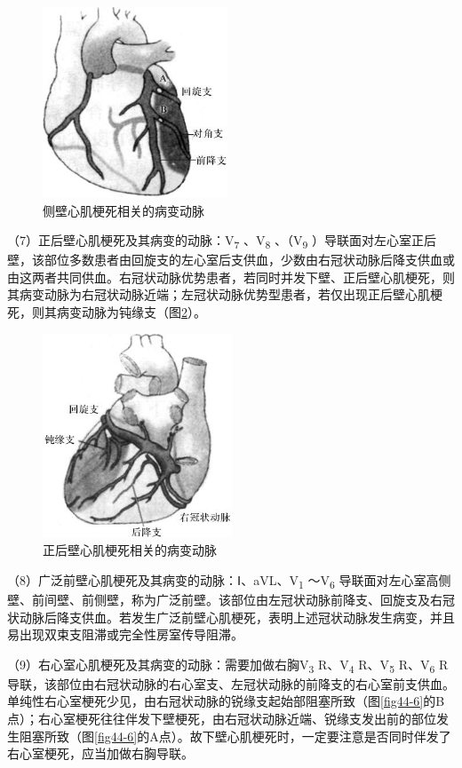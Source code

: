 \begin{figure}[!htbp]
 \centering
 \includegraphics[width=2.16667in,height=2.23958in]{./images/Image00712.jpg}
 \captionsetup{justification=centering}
 \caption{侧壁心肌梗死相关的病变动脉}
 \label{fig44-4}
  \end{figure} 

（7）正后壁心肌梗死及其病变的动脉：V\textsubscript{7}
、V\textsubscript{8} 、（V\textsubscript{9}
）导联面对左心室正后壁，该部位多数患者由回旋支的左心室后支供血，少数由右冠状动脉后降支供血或由这两者共同供血。右冠状动脉优势患者，若同时并发下壁、正后壁心肌梗死，则其病变动脉为右冠状动脉近端；左冠状动脉优势型患者，若仅出现正后壁心肌梗死，则其病变动脉为钝缘支（图\ref{fig44-5}）。

\begin{figure}[!htbp]
 \centering
 \includegraphics[width=2.21875in,height=2.39583in]{./images/Image00713.jpg}
 \captionsetup{justification=centering}
 \caption{正后壁心肌梗死相关的病变动脉}
 \label{fig44-5}
  \end{figure} 

（8）广泛前壁心肌梗死及其病变的动脉：Ⅰ、aVL、V\textsubscript{1}
～V\textsubscript{6}
导联面对左心室高侧壁、前间壁、前侧壁，称为广泛前壁。该部位由左冠状动脉前降支、回旋支及右冠状动脉后降支供血。若发生广泛前壁心肌梗死，表明上述冠状动脉发生病变，并且易出现双束支阻滞或完全性房室传导阻滞。

（9）右心室心肌梗死及其病变的动脉：需要加做右胸V\textsubscript{3}
R、V\textsubscript{4} R、V\textsubscript{5} R、V\textsubscript{6}
R导联，该部位由右冠状动脉的右心室支、左冠状动脉的前降支的右心室前支供血。单纯性右心室梗死少见，由右冠状动脉的锐缘支起始部阻塞所致（图\ref{fig44-6}的B点）；右心室梗死往往伴发下壁梗死，由右冠状动脉近端、锐缘支发出前的部位发生阻塞所致（图\ref{fig44-6}的A点）。故下壁心肌梗死时，一定要注意是否同时伴发了右心室梗死，应当加做右胸导联。


